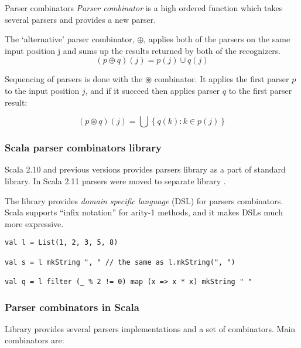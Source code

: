 \documentclass[t]{beamer}
\begin{document}
\begin{frame}{Parser combinators}
\emph{Parser combinator} is a high ordered function which takes several parsers and provides a
new parser.

The ‘alternative’ parser combinator, $\oplus$, applies both of the parsers on the same input
position j and sums up the results returned by both of the recognizers.
\begin{equation*}
(p \oplus q)(j) = p(j) \cup q(j)
\end{equation*}

Sequencing of parsers is done with the $\circledast$ combinator. It applies the first parser $p$
to the input position $j$, and if it succeed then applies parser $q$ to the first parser result:

\begin{equation*}
(p \circledast q)(j) = \bigcup \left\{q(k) : k \in p(j) \right\}
\end{equation*}

\end{frame}

\begin{frame}[fragile]
\frametitle{Scala parser combinators library}
Scala 2.10 and previous versions provides parsers library as a part of standard library.
In Scala 2.11 parsers were moved to separate library .

The library provides \emph{domain specific language} (DSL) for parsers combinators.
Scala supports ``infix notation'' for arity-1 methods, and it makes DSLs much more
expressive.
\begin{lstlisting}
val l = List(1, 2, 3, 5, 8)

val s = l mkString ", " // the same as l.mkString(", ")

val q = l filter (_ % 2 != 0) map (x => x * x) mkString " "
\end{lstlisting}
\end{frame}

\begin{frame}[fragile]
\frametitle{Parser combinators in Scala}
Library provides several parsers implementations and a set of combinators.
Main combinators are:
\end{frame}
\end{document}
